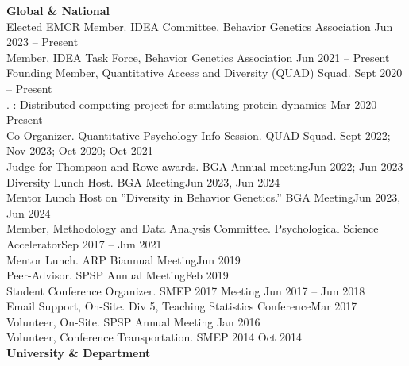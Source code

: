 {\large \textbf{Global \& National}}\\
Elected EMCR Member. IDEA Committee, Behavior Genetics Association \hfill{Jun 2023 – Present}\\ %
Member, IDEA Task Force, Behavior Genetics Association \hfill{Jun 2021 – Present}\\
Founding Member, Quantitative Access and Diversity (QUAD) Squad. \hfill{Sept 2020 – Present}\\%
. : Distributed computing project for simulating protein dynamics \hfill{Mar 2020 – Present}\\
Co-Organizer. Quantitative Psychology Info Session. QUAD Squad. \hfill{Sept 2022; Nov 2023;}\newline
\hspace*{0pt}\hfill{Oct 2020; Oct 2021}\smallskip\\
Judge for Thompson and Rowe awards. BGA Annual meeting\hfill{Jun 2022; Jun 2023}\\
Diversity Lunch Host. BGA Meeting\hfill{Jun 2023, Jun 2024}\\%
Mentor Lunch Host on ''Diversity in Behavior Genetics.'' BGA Meeting\hfill{Jun 2023, Jun 2024}\\
Member, Methodology and Data Analysis Committee. Psychological Science Accelerator\hfill{Sep 2017 – Jun 2021}\\
Mentor Lunch. ARP Biannual Meeting\hfill{Jun 2019}\\
Peer-Advisor. SPSP Annual Meeting\hfill{Feb 2019}\\
Student Conference Organizer. SMEP 2017 Meeting \hfill{Jun 2017 – Jun 2018}\\
Email Support, On-Site. Div 5, Teaching Statistics Conference\hfill{Mar 2017}\\
Volunteer, On-Site. SPSP Annual Meeting \hfill{Jan 2016}\\
Volunteer, Conference Transportation. SMEP 2014  \hfill{Oct 2014}\medskip\\
{\large \textbf{University \& Department}}\\
